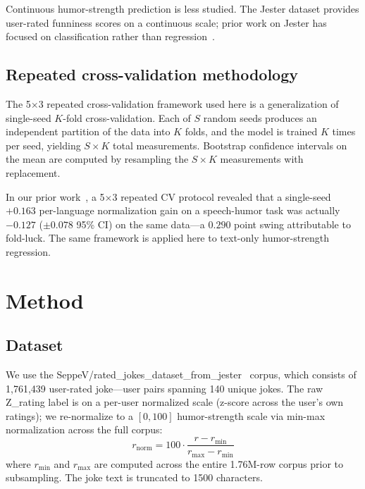 \documentclass[11pt, letterpaper]{article}
\begin{document}
Continuous humor-strength prediction is less studied. The Jester dataset provides user-rated funniness scores on a continuous scale; prior work on Jester has focused on classification rather than regression~\cite{seppev-jester}.

\subsection{Repeated cross-validation methodology}

The 5$\times$3 repeated cross-validation framework used here is a generalization of single-seed $K$-fold cross-validation. Each of $S$ random seeds produces an independent partition of the data into $K$ folds, and the model is trained $K$ times per seed, yielding $S \times K$ total measurements. Bootstrap confidence intervals on the mean are computed by resampling the $S \times K$ measurements with replacement.

In our prior work~\cite{hahascore-methodology}, a 5$\times$3 repeated CV protocol revealed that a single-seed $+0.163$ per-language normalization gain on a speech-humor task was actually $-0.127$ ($\pm 0.078$ 95\% CI) on the same data---a $0.290$ point swing attributable to fold-luck. The same framework is applied here to text-only humor-strength regression.

\section{Method}

\subsection{Dataset}

We use the SeppeV/rated\_jokes\_dataset\_from\_jester~\cite{seppev-jester} corpus, which consists of 1,761,439 user-rated joke---user pairs spanning 140 unique jokes. The raw Z\_rating label is on a per-user normalized scale (z-score across the user's own ratings); we re-normalize to a $[0, 100]$ humor-strength scale via min-max normalization across the full corpus:
\begin{equation}
r_{\text{norm}} = 100 \cdot \frac{r - r_{\min}}{r_{\max} - r_{\min}}
\end{equation}
where $r_{\min}$ and $r_{\max}$ are computed across the entire 1.76M-row corpus prior to subsampling. The joke text is truncated to 1500 characters.
\end{document}
